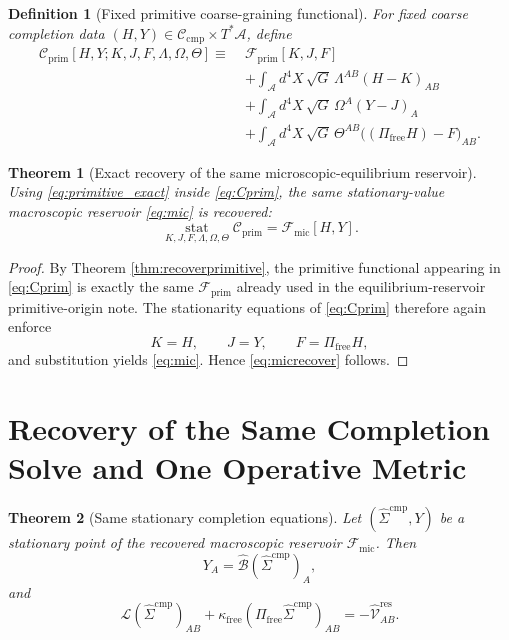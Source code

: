 \documentclass[11pt]{article}
\newcommand{\Sub}{\mathcal A}
\newcommand{\CompLift}{\widehat\Sigma^{\mathrm{cmp}}}
\newcommand{\ResidualLift}{\widehat{\mathcal V}^{\mathrm{res}}}
\newcommand{\SubGaugeVec}{\widehat{\mathcal B}}
\newcommand{\SubReducedEin}{\widehat{\mathcal L}}
\newcommand{\FreeProj}{\Pi_{\mathrm{free}}}
\newcommand{\GaugeAux}{Y}
\newcommand{\CompClass}{\mathscr C_{\mathrm{cmp}}}
\newcommand{\MicFunctional}{\mathscr F_{\mathrm{mic}}}
\newcommand{\PrimFunctional}{\mathscr F_{\mathrm{prim}}}
\newcommand{\FreeStiff}{\kappa_{\mathrm{free}}}
\newcommand{\PrimStrain}{K}
\newcommand{\PrimNeutral}{J}
\newcommand{\PrimFree}{F}
\newcommand{\StrainMult}{\Lambda}
\newcommand{\NeutralMult}{\Omega}
\newcommand{\FreeMult}{\Theta}
\newtheorem{definition}{Definition}
\newtheorem{theorem}{Theorem}
\begin{document}
\begin{definition}[Fixed primitive coarse-graining functional]
\label{def:prim_cg}
For fixed coarse completion data \((H,\GaugeAux)\in\CompClass\times T^*\Sub\), define
\begin{equation}
\begin{aligned}
\mathscr C_{\mathrm{prim}}[H,\GaugeAux;\PrimStrain,\PrimNeutral,\PrimFree,\StrainMult,\NeutralMult,\FreeMult]
\equiv\;
&\PrimFunctional[\PrimStrain,\PrimNeutral,\PrimFree]
\\
&+\int_{\Sub} d^4X\,\sqrt{G}\,
\StrainMult^{AB}(H-\PrimStrain)_{AB}
\\
&+\int_{\Sub} d^4X\,\sqrt{G}\,
\NeutralMult^A(\GaugeAux-\PrimNeutral)_A
\\
&+\int_{\Sub} d^4X\,\sqrt{G}\,
\FreeMult^{AB}\bigl((\FreeProj H)-\PrimFree\bigr)_{AB}.
\end{aligned}
\label{eq:Cprim}
\end{equation}
\end{definition}

\begin{theorem}[Exact recovery of the same microscopic-equilibrium reservoir]
\label{thm:recovermic}
Using \eqref{eq:primitive_exact} inside \eqref{eq:Cprim}, the same stationary-value macroscopic reservoir \eqref{eq:mic} is recovered:
\begin{equation}
\operatorname*{stat}_{\PrimStrain,\PrimNeutral,\PrimFree,\StrainMult,\NeutralMult,\FreeMult}
\mathscr C_{\mathrm{prim}}
=
\MicFunctional[H,\GaugeAux].
\label{eq:micrecover}
\end{equation}
\end{theorem}

\begin{proof}
By Theorem \ref{thm:recoverprimitive}, the primitive functional appearing in \eqref{eq:Cprim} is exactly the same \(\PrimFunctional\) already used in the equilibrium-reservoir primitive-origin note. The stationarity equations of \eqref{eq:Cprim} therefore again enforce
\[
\PrimStrain=H,
\qquad
\PrimNeutral=\GaugeAux,
\qquad
\PrimFree=\FreeProj H,
\]
and substitution yields \eqref{eq:mic}. Hence \eqref{eq:micrecover} follows.
\end{proof}

\section{Recovery of the Same Completion Solve and One Operative Metric}

\begin{theorem}[Same stationary completion equations]
\label{thm:stationary}
Let \((\CompLift,\GaugeAux)\) be a stationary point of the recovered macroscopic reservoir \(\MicFunctional\). Then
\begin{equation}
\GaugeAux_A=\SubGaugeVec(\CompLift)_A,
\label{eq:Yeq}
\end{equation}
and
\begin{equation}
\SubReducedEin(\CompLift)_{AB}
+\FreeStiff(\FreeProj\CompLift)_{AB}
=
-\ResidualLift_{AB}.
\label{eq:Heq}
\end{equation}
\end{theorem}
\end{document}
